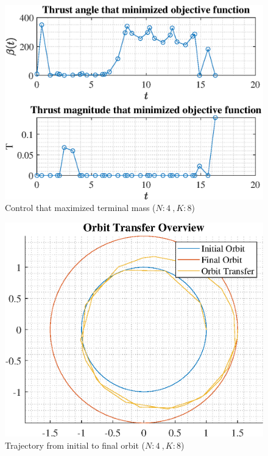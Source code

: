 \documentclass[]{article}
\begin{document}
\begin{figure}
	\centering
	\includegraphics[scale=0.75]{control_N4_K8_C2_mf.eps}
	\caption{Control that maximized terminal mass (\(N:4\ , K:8\))}
	\label{fig:control_N4_K8_C2_mf}
\end{figure}
\begin{figure}
	\centering
	\includegraphics[scale=0.75]{orbit_N4_K8_C2_mf.eps}
	\caption{Trajectory from initial to final orbit (\(N:4\ , K:8\))}
	\label{fig:orbit_N4_K8_C2_mf}
\end{figure}
\end{document}
